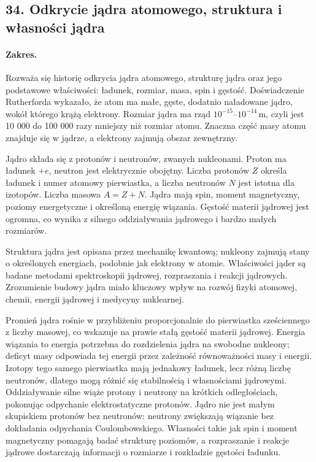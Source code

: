 \documentclass[11pt,a4paper]{article}
\begin{document}
\subsection{34. Odkrycie jądra atomowego, struktura i własności jądra}
\paragraph{Zakres.} Rozważa się historię odkrycia jądra atomowego, strukturę jądra oraz jego podstawowe właściwości: ładunek, rozmiar, masa, spin i gęstość. Doświadczenie Rutherforda wykazało, że atom ma małe, gęste, dodatnio naładowane jądro, wokół którego krążą elektrony. Rozmiar jądra ma rząd $10^{-15}$–$10^{-14}\,\mathrm{m}$, czyli jest 10 000 do 100 000 razy mniejszy niż rozmiar atomu. Znaczna część masy atomu znajduje się w jądrze, a elektrony zajmują obszar zewnętrzny.\par
Jądro składa się z protonów i neutronów, zwanych nukleonami. Proton ma ładunek $+e$, neutron jest elektrycznie obojętny. Liczba protonów $Z$ określa ładunek i numer atomowy pierwiastka, a liczba neutronów $N$ jest istotna dla izotopów. Liczba masowa $A=Z+N$. Jądra mają spin, moment magnetyczny, poziomy energetyczne i określoną energię wiązania. Gęstość materii jądrowej jest ogromna, co wynika z silnego oddziaływania jądrowego i bardzo małych rozmiarów.\par
Struktura jądra jest opisana przez mechanikę kwantową; nukleony zajmują stany o określonych energiach, podobnie jak elektrony w atomie. Właściwości jąder są badane metodami spektroskopii jądrowej, rozpraszania i reakcji jądrowych. Zrozumienie budowy jądra miało kluczowy wpływ na rozwój fizyki atomowej, chemii, energii jądrowej i medycyny nuklearnej.\par

Promień jądra rośnie w przybliżeniu proporcjonalnie do pierwiastka sześciennego z liczby masowej, co wskazuje na prawie stałą gęstość materii jądrowej. Energia wiązania to energia potrzebna do rozdzielenia jądra na swobodne nukleony; deficyt masy odpowiada tej energii przez zależność równoważności masy i energii. Izotopy tego samego pierwiastka mają jednakowy ładunek, lecz różną liczbę neutronów, dlatego mogą różnić się stabilnością i własnościami jądrowymi. Oddziaływanie silne wiąże protony i neutrony na krótkich odległościach, pokonując odpychanie elektrostatyczne protonów. Jądro nie jest małym skupiskiem protonów bez neutronów: neutrony zwiększają wiązanie bez dokładania odpychania Coulombowskiego. Własności takie jak spin i moment magnetyczny pomagają badać strukturę poziomów, a rozpraszanie i reakcje jądrowe dostarczają informacji o rozmiarze i rozkładzie gęstości ładunku.
\par
\end{document}
